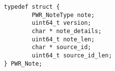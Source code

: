 \begin{center}
\begin{minipage}{.95\linewidth}%
\begin{lstlisting}
typedef struct {
        PWR_NoteType note;
        uint64_t version;
        char * note_details;
        uint64_t note_len;
        char * source_id;
        uint64_t source_id_len;
} PWR_Note;
\end{lstlisting}
\end{minipage}
\end{center}


